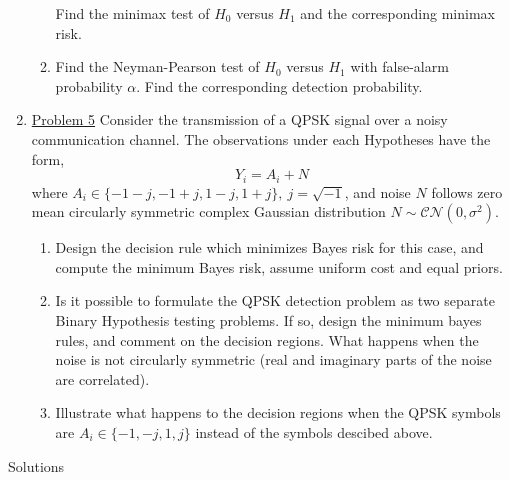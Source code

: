 \documentclass[a4paper,english,10pt]{article}
\begin{document}
\begin{enumerate}
\begin{enumerate}
Find the minimax test of $H_0$ versus $H_1$ and the corresponding minimax risk.
\item Find the Neyman-Pearson test of $H_0$ versus $H_1$ with false-alarm probability $\alpha$. Find the corresponding detection probability.
\end{enumerate}
\item  \hyperlink{solution5}{Problem 5}
Consider the transmission of a QPSK signal over a noisy communication channel. The observations under each Hypotheses have the form,
\begin{equation*}
Y_i=A_i+N	
\end{equation*}
where $A_i\in \{-1-j,-1+j,1-j,1+j\},~j=\sqrt{-1}$, and noise $N$ follows zero mean circularly symmetric complex Gaussian distribution $N\sim\mathcal{CN}(0,\sigma^2)$. 
\begin{enumerate}[label=(\alph{*}).]
\item Design the decision rule which minimizes Bayes risk for this case, and compute the minimum Bayes risk, assume uniform cost and equal priors. 
\item Is it possible to formulate the QPSK detection problem as two separate Binary Hypothesis testing problems. If so, design the minimum bayes rules, and comment on the decision regions. What happens when the noise is not circularly symmetric (real and imaginary parts of the noise are correlated).
\item Illustrate what happens to the decision regions when the QPSK symbols are $A_i\in\{-1,-j,1,j\}$ instead of the symbols descibed  above. 
\end{enumerate}
\end{enumerate}
\newpage
\par{\centering\Large {Solutions}\par}





\end{document}
